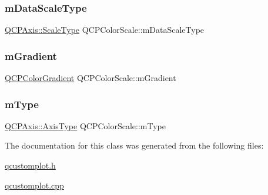 \mbox{\label{class_q_c_p_color_scale_a2754d6a78736f64a241e333fbd955372}} 
\subsubsection{\texorpdfstring{m\+Data\+Scale\+Type}{mDataScaleType}}
{\footnotesize\ttfamily \hyperlink{class_q_c_p_axis_a36d8e8658dbaa179bf2aeb973db2d6f0}{Q\+C\+P\+Axis\+::\+Scale\+Type} Q\+C\+P\+Color\+Scale\+::m\+Data\+Scale\+Type\hspace{0.3cm}{\ttfamily [protected]}}

\mbox{\label{class_q_c_p_color_scale_ae195a385032066b5c46cc3301af58922}} 
\subsubsection{\texorpdfstring{m\+Gradient}{mGradient}}
{\footnotesize\ttfamily \hyperlink{class_q_c_p_color_gradient}{Q\+C\+P\+Color\+Gradient} Q\+C\+P\+Color\+Scale\+::m\+Gradient\hspace{0.3cm}{\ttfamily [protected]}}

\mbox{\label{class_q_c_p_color_scale_a7d47ed4ab76f38e50164e9d77fe33789}} 
\subsubsection{\texorpdfstring{m\+Type}{mType}}
{\footnotesize\ttfamily \hyperlink{class_q_c_p_axis_ae2bcc1728b382f10f064612b368bc18a}{Q\+C\+P\+Axis\+::\+Axis\+Type} Q\+C\+P\+Color\+Scale\+::m\+Type\hspace{0.3cm}{\ttfamily [protected]}}



The documentation for this class was generated from the following files\+:\begin{DoxyCompactItemize}
\item 
\hyperlink{qcustomplot_8h}{qcustomplot.\+h}\item 
\hyperlink{qcustomplot_8cpp}{qcustomplot.\+cpp}\end{DoxyCompactItemize}
